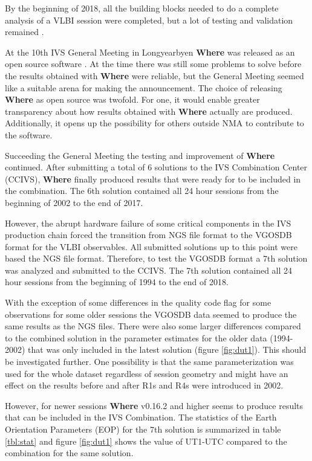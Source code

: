 \documentclass[twocolumn,twoside]{svmultivs_br} %
\begin{document}
By the beginning of 2018, all the building blocks needed to do a complete analysis of a VLBI session were completed, but
a lot of testing and validation remained \cite{kirkvik2018}.

At the 10th IVS General Meeting in Longyearbyen
\textbf{Where} was released as an open source software \cite{hjelle2018}. At the time there was still some problems to
solve before the results obtained with \textbf{Where} were reliable, but the General Meeting seemed like a suitable
arena for making the announcement. The choice of releasing \textbf{Where} as open source was twofold. For one, it would
enable greater transparency about how results obtained with \textbf{Where} actually are produced. Additionally, it opens
up the possibility for others outside NMA to contribute to the software.

Succeeding the General Meeting the testing and improvement of \textbf{Where} continued. After submitting a total of 6 solutions to the IVS Combination Center (CCIVS), \textbf{Where}
finally produced results that were ready for to be included in the combination. The 6th solution contained all 24 hour
sessions from the beginning of 2002 to the end of 2017.

However, the abrupt hardware failure of some critical components in the IVS production chain forced the transition from
NGS file format to the VGOSDB format for the VLBI observables. All submitted solutions up to this point were based the NGS
file format. Therefore, to test the VGOSDB format a 7th solution was analyzed and submitted to the CCIVS. The 7th
solution contained all 24 hour sessions from the beginning of 1994 to the end of 2018.

With the exception of some differences in the quality code flag for some observations for some older sessions the VGOSDB
data seemed to produce the same results as the NGS files. There were also some larger differences compared to the
combined solution in the parameter estimates for the older data (1994-2002) that was only included in the latest
solution (figure \ref{fig:dut1}). This should be investigated further. One possibility is that the same parameterization
was used for the whole dataset regardless of session geometry and might have an effect on the results before and after
R1s and R4s were introduced in 2002.

However, for newer sessions
\textbf{Where} v0.16.2 and higher seems to produce results that can be included in the IVS Combination. The statistics
of the Earth Orientation Parameters (EOP) for the 7th solution is summarized in table \ref{tbl:stat} and figure
\ref{fig:dut1} shows the value of UT1-UTC compared to the combination for the same solution.
\end{document}
